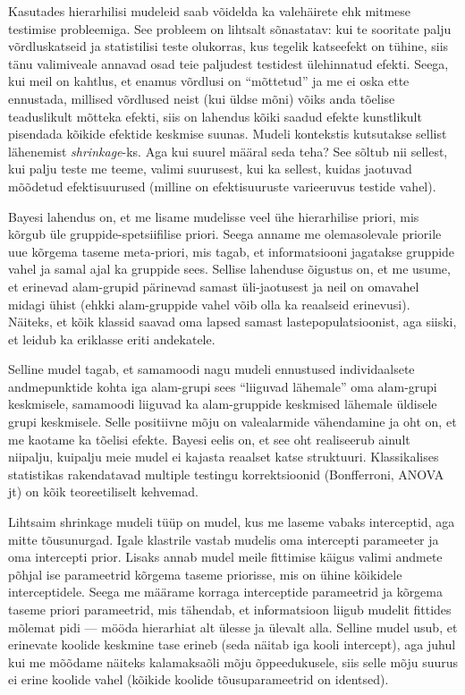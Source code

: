 \documentclass[]{book}
\begin{document}
Kasutades hierarhilisi mudeleid saab võidelda ka valehäirete ehk mitmese
testimise probleemiga. See probleem on lihtsalt sõnastatav: kui te
sooritate palju võrdluskatseid ja statistilisi teste olukorras, kus
tegelik katseefekt on tühine, siis tänu valimiveale annavad osad teie
paljudest testidest ülehinnatud efekti. Seega, kui meil on kahtlus, et
enamus võrdlusi on ``mõttetud'' ja me ei oska ette ennustada, millised
võrdlused neist (kui üldse mõni) võiks anda tõelise teaduslikult mõtteka
efekti, siis on lahendus kõiki saadud efekte kunstlikult pisendada
kõikide efektide keskmise suunas. Mudeli kontekstis kutsutakse sellist
lähenemist \emph{shrinkage}-ks. Aga kui suurel määral seda teha? See
sõltub nii sellest, kui palju teste me teeme, valimi suurusest, kui ka
sellest, kuidas jaotuvad mõõdetud efektisuurused (milline on
efektisuuruste varieeruvus testide vahel).

Bayesi lahendus on, et me lisame mudelisse veel ühe hierarhilise priori,
mis kõrgub üle gruppide-spetsiifilise priori. Seega anname me
olemasolevale priorile uue kõrgema taseme meta-priori, mis tagab, et
informatsiooni jagatakse gruppide vahel ja samal ajal ka gruppide sees.
Sellise lahenduse õigustus on, et me usume, et erinevad alam-grupid
pärinevad samast üli-jaotusest ja neil on omavahel midagi ühist (ehkki
alam-gruppide vahel võib olla ka reaalseid erinevusi). Näiteks, et kõik
klassid saavad oma lapsed samast lastepopulatsioonist, aga siiski, et
leidub ka eriklasse eriti andekatele.

Selline mudel tagab, et samamoodi nagu mudeli ennustused individaalsete
andmepunktide kohta iga alam-grupi sees ``liiguvad lähemale'' oma
alam-grupi keskmisele, samamoodi liiguvad ka alam-gruppide keskmised
lähemale üldisele grupi keskmisele. Selle positiivne mõju on
valealarmide vähendamine ja oht on, et me kaotame ka tõelisi efekte.
Bayesi eelis on, et see oht realiseerub ainult niipalju, kuipalju meie
mudel ei kajasta reaalset katse struktuuri. Klassikalises statistikas
rakendatavad multiple testingu korrektsioonid (Bonfferroni, ANOVA jt) on
kõik teoreetiliselt kehvemad.

Lihtsaim shrinkage mudeli tüüp on mudel, kus me laseme vabaks
interceptid, aga mitte tõusunurgad. Igale klastrile vastab mudelis oma
intercepti parameeter ja oma intercepti prior. Lisaks annab mudel meile
fittimise käigus valimi andmete põhjal ise parameetrid kõrgema taseme
priorisse, mis on ühine kõikidele interceptidele. Seega me määrame
korraga interceptide parameetrid ja kõrgema taseme priori parameetrid,
mis tähendab, et informatsioon liigub mudelit fittides mõlemat pidi ---
mööda hierarhiat alt ülesse ja ülevalt alla. Selline mudel usub, et
erinevate koolide keskmine tase erineb (seda näitab iga kooli
intercept), aga juhul kui me mõõdame näiteks kalamaksaõli mõju
õppeedukusele, siis selle mõju suurus ei erine koolide vahel (kõikide
koolide tõusuparameetrid on identsed).
\end{document}
